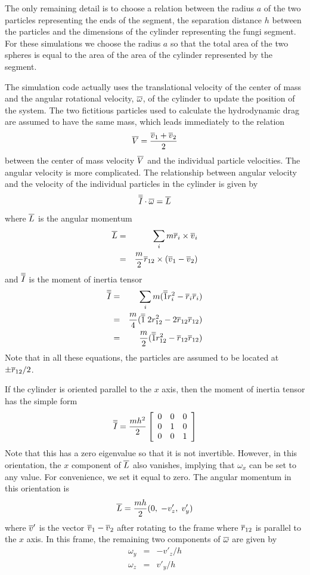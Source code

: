 \documentclass[12pt]{article}
\begin{document}
The only remaining detail
is to choose a relation between the radius $a$ of the two particles representing
the ends of the segment, the separation distance $h$ between the particles and
the dimensions of the cylinder representing the fungi segment. For these simulations
we choose the radius $a$ so that the total area of the two spheres is equal to the
area of the area of the cylinder represented by the segment.

The simulation code actually uses the translational velocity of the center of mass and
the angular rotational velocity, $\overline{\omega}$, of the cylinder to update the position of the system.
The two fictitious particles used to  calculate the hydrodynamic drag are assumed to
have the same mass, which leads immediately to the relation
\[
\overline{V} = \frac{\overline{v}_1+\overline{v}_2}{2}
\]
between the center of mass velocity $\overline{V}$ and the individual particle velocities.
The angular velocity is more complicated. The relationship between angular velocity
and the velocity of the individual particles in the cylinder is given by
\[
\overline{\overline{I}}\cdot\overline{\omega} = \overline{L}
\]
where $\overline{L}$ is the angular momentum
\begin{eqnarray*}
\overline{L} & = & \sum_i m\overline{r}_i\times\overline{v}_i\\
& = & \frac{m}{2}\overline{r}_{12}\times(\overline{v}_1-\overline{v}_2)
\end{eqnarray*}
and $\overline{\overline{I}}$ is the moment of inertia tensor
\begin{eqnarray*}
\overline{\overline{I}} & = & \sum_i m (\overline{\overline{1}} r_i^2-\overline{r}_i\overline{r}_i) \\
& = & \frac{m}{4}(\overline{\overline{1}}\; 2r_{12}^2-2\overline{r}_{12}\overline{r}_{12}) \\
& = & \frac{m}{2}(\overline{\overline{1}} r_{12}^2-\overline{r}_{12}\overline{r}_{12}) \\
\end{eqnarray*}
Note that in all these equations, the particles are assumed to be located at
$\pm \overline{r}_{12}/2$.

If the cylinder is oriented parallel to the $x$ axis, then the moment of inertia tensor
has the simple form
\[
\overline{\overline{I}} = \frac{mh^2}{2}\left[\begin{array}{ccc}
0 & 0 & 0\\
0 & 1 & 0\\
0 & 0 & 1\\
\end{array}\right]
\]
Note that this has a zero eigenvalue so that it is not invertible. However, in this
orientation, the $x$ component of $\overline{L}$ also vanishes, implying that $\omega_x$ can be
set to any value. For convenience, we set it equal to zero. The angular momentum in this
orientation is
\[
\overline{L} = \frac{mh}{2}(0,\;-v'_z,\;v'_y)
\]
where $\overline{v}'$ is the vector $\overline{v}_1-\overline{v}_2$ after rotating to the frame where
$\overline{r}_{12}$ is parallel to the $x$ axis. In this frame, the remaining two components
of $\overline{\omega}$ are given by 
\begin{eqnarray*}
\omega_y & = & -v'_z/h \\
\omega_z & = & v'_y/h
\end{eqnarray*}
\end{document}
